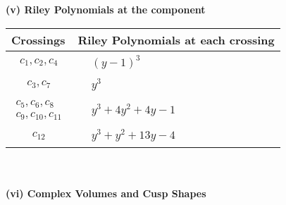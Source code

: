 \documentclass[1p]{elsarticle_modified}
\theoremstyle{definition}
\begin{document}
\newpage\renewcommand{\arraystretch}{1}
\flushleft \textbf{(v) Riley Polynomials at the component}\newline \\
\begin{tabular}{m{50pt}|m{274pt}}
Crossings & \hspace{64pt}Riley Polynomials at each crossing \\
\hline $$\begin{aligned}c_{1},c_{2},c_{4}\end{aligned}$$&$\begin{aligned}
&(y-1)^3
\end{aligned}$\\
\hline $$\begin{aligned}c_{3},c_{7}\end{aligned}$$&$\begin{aligned}
&y^3
\end{aligned}$\\
\hline $$\begin{aligned}c_{5},c_{6},c_{8}\\c_{9},c_{10},c_{11}\end{aligned}$$&$\begin{aligned}
&y^3+4 y^2+4 y-1
\end{aligned}$\\
\hline $$\begin{aligned}c_{12}\end{aligned}$$&$\begin{aligned}
&y^3+y^2+13 y-4
\end{aligned}$\\
\hline
\end{tabular}\\~\\
\newpage\flushleft \textbf{(vi) Complex Volumes and Cusp Shapes}
\end{document}
